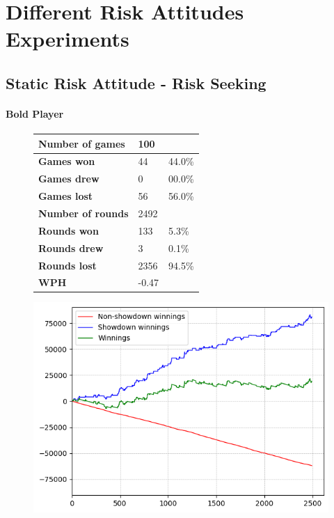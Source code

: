 \chapter{Different Risk Attitudes Experiments}
\label{appendix:experiments}
\section{Static Risk Attitude - Risk Seeking}
\subsubsection{Bold Player}
\begin{figure}[H]
    \centering
    \begin{minipage}{\textwidth}
        \begin{minipage}{0.40\textwidth}
            \begin{tabular}{|l|l|l|}
                \hline
                \textbf{Number of games}  & 100   &        \\ \hline
                \textbf{Games won}        & 44    & 44.0\% \\ \hline
                \textbf{Games drew}       & 0     & 00.0\%  \\ \hline
                \textbf{Games lost}       & 56    & 56.0\% \\ \hline
                \textbf{Number of rounds} & 2492  &        \\ \hline
                \textbf{Rounds won}       & 133   & 5.3\%  \\ \hline
                \textbf{Rounds drew}      & 3     & 0.1\%  \\ \hline
                \textbf{Rounds lost}      & 2356  & 94.5\% \\ \hline
                \textbf{WPH}              & -0.47 &        \\ \hline
            \end{tabular}
        \end{minipage}
        \hspace{0.05\textwidth}
        \begin{minipage}{0.5\textwidth}
            \includegraphics[width=\textwidth]{graphics/risk-seeking/bold.png}

\end{minipage}
\end{minipage}
\end{figure}
